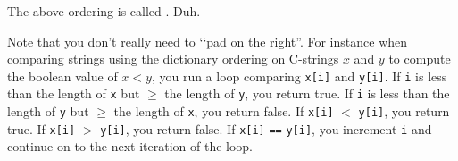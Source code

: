 The above ordering is called . Duh.

Note that you  don't really need to \lq\lq pad on the right''.
For instance when comparing strings using the dictionary ordering
on C-strings $x$ and $y$ to compute the boolean value of
$x < y$,
you run a loop comparing \verb!x[i]! and \verb!y[i]!.
If \verb!i! is less than the length of \verb!x! but $\geq$ the length of
\verb!y!,
you return true.
If \verb!i! is less than the length of \verb!y! but $\geq$ the length of
\verb!x!,
you return false.
If \verb!x[i]! $<$ \verb!y[i]!, you return true.
If \verb!x[i]! $>$ \verb!y[i]!, you return false.
If \verb!x[i]! \verb!==! \verb!y[i]!, you increment \verb!i! and
continue on to the next iteration of the loop.
